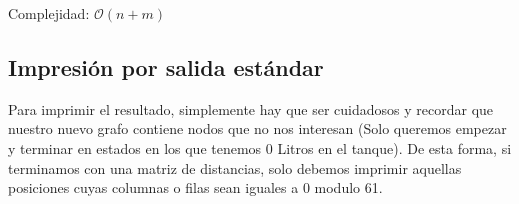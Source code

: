 \indent Complejidad: $\mathcal{O}(n+m)$

\subsection{Impresión por salida estándar}
Para imprimir el resultado, simplemente hay que ser cuidadosos y recordar que nuestro nuevo grafo contiene nodos que no nos interesan (Solo queremos empezar y terminar en estados en los que tenemos 0 Litros en el tanque). De esta forma, si terminamos con una matriz de distancias, solo debemos imprimir aquellas posiciones cuyas columnas o filas sean iguales a 0 modulo 61.

%
